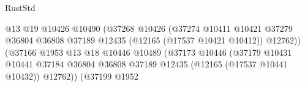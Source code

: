\begin{lexlean}{RustStd}
\begin{coremodule}
                                                              @13
                                                              @19
                                                              @10426
                                                              @10490
                                                              (@37268
                                                                @10426
                                                                (@37274
                                                                  @10411
                                                                  @10421
                                                                  @37279
                                                                  @36804
                                                                  @36808
                                                                  @37189
                                                                  @12435
                                                                  (@12165 (@17537 @10421 @10412))
                                                                  @12762))
                                                              (@37166
                                                                @1953
                                                                @13
                                                                @18
                                                                @10446
                                                                @10489
                                                                (@37173
                                                                  @10446
                                                                  (@37179
                                                                    @10431
                                                                    @10441
                                                                    @37184
                                                                    @36804
                                                                    @36808
                                                                    @37189
                                                                    @12435
                                                                    (@12165 (@17537 @10441 @10432))
                                                                    @12762))
                                                                (@37199
                                                                  @1952

\end{coremodule}
\end{lexlean}
